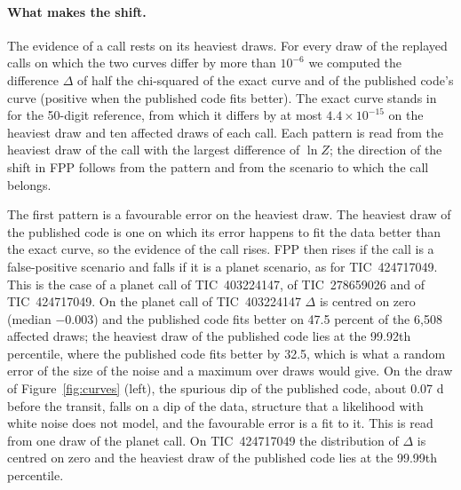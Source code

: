 \documentclass[11pt]{article}
\begin{document}

\paragraph{What makes the shift.} The evidence of a call rests on its heaviest draws. For every draw of the replayed calls on which the two curves differ by more than $10^{-6}$ we computed the difference $\Delta$ of half the chi-squared of the exact curve and of the published code's curve (positive when the published code fits better). The exact curve stands in for the 50-digit reference, from which it differs by at most $4.4\times10^{-15}$ on the heaviest draw and ten affected draws of each call. Each pattern is read from the heaviest draw of the call with the largest difference of $\ln Z$; the direction of the shift in FPP follows from the pattern and from the scenario to which the call belongs.

The first pattern is a favourable error on the heaviest draw. The heaviest draw of the published code is one on which its error happens to fit the data better than the exact curve, so the evidence of the call rises. FPP then rises if the call is a false-positive scenario and falls if it is a planet scenario, as for TIC~424717049. This is the case of a planet call of TIC~403224147, of TIC~278659026 and of TIC~424717049. On the planet call of TIC~403224147 $\Delta$ is centred on zero (median $-0.003$) and the published code fits better on 47.5 percent of the 6,508 affected draws; the heaviest draw of the published code lies at the 99.92th percentile, where the published code fits better by 32.5, which is what a random error of the size of the noise and a maximum over draws would give. On the draw of Figure~\ref{fig:curves} (left), the spurious dip of the published code, about 0.07 d before the transit, falls on a dip of the data, structure that a likelihood with white noise does not model, and the favourable error is a fit to it. This is read from one draw of the planet call. On TIC~424717049 the distribution of $\Delta$ is centred on zero and the heaviest draw of the published code lies at the 99.99th percentile.
\end{document}
